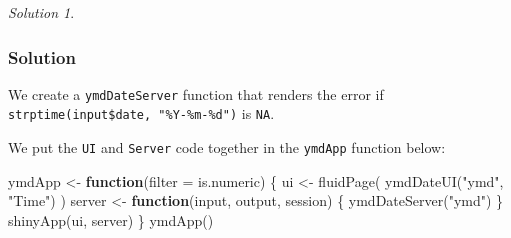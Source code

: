 \documentclass[
]{book}
\newenvironment{Shaded}{\begin{snugshade}}{\end{snugshade}}
\newcommand{\AttributeTok}[1]{\textcolor[rgb]{0.77,0.63,0.00}{#1}}
\newcommand{\ConstantTok}[1]{\textcolor[rgb]{0.00,0.00,0.00}{#1}}
\newcommand{\ControlFlowTok}[1]{\textcolor[rgb]{0.13,0.29,0.53}{\textbf{#1}}}
\newcommand{\FunctionTok}[1]{\textcolor[rgb]{0.00,0.00,0.00}{#1}}
\newcommand{\NormalTok}[1]{#1}
\newcommand{\OtherTok}[1]{\textcolor[rgb]{0.56,0.35,0.01}{#1}}
\newcommand{\SpecialCharTok}[1]{\textcolor[rgb]{0.00,0.00,0.00}{#1}}
\newcommand{\StringTok}[1]{\textcolor[rgb]{0.31,0.60,0.02}{#1}}
\theoremstyle{definition}
\theoremstyle{definition}
\theoremstyle{definition}
\theoremstyle{definition}
\theoremstyle{remark}
\newtheorem*{solution}{Solution}
\begin{document}
\begin{solution}
\leavevmode

\hypertarget{solution-49}{%
\subsubsection*{Solution}\label{solution-49}}

We create a \texttt{ymdDateServer} function that renders the error if \texttt{strptime(input\$date,\ "\%Y-\%m-\%d")} is \texttt{NA}.

\begin{Shaded}
\end{Shaded}

We put the \texttt{UI} and \texttt{Server} code together in the \texttt{ymdApp} function below:

\begin{Shaded}
\begin{Highlighting}[]
\NormalTok{ymdApp }\OtherTok{\textless{}{-}} \ControlFlowTok{function}\NormalTok{(}\AttributeTok{filter =}\NormalTok{ is.numeric) \{}
\NormalTok{    ui }\OtherTok{\textless{}{-}} \FunctionTok{fluidPage}\NormalTok{(}
        \FunctionTok{ymdDateUI}\NormalTok{(}\StringTok{"ymd"}\NormalTok{, }\StringTok{"Time"}\NormalTok{)}
\NormalTok{    )}
\NormalTok{    server }\OtherTok{\textless{}{-}} \ControlFlowTok{function}\NormalTok{(input, output, session) \{}
        \FunctionTok{ymdDateServer}\NormalTok{(}\StringTok{"ymd"}\NormalTok{)}
\NormalTok{    \}}
    \FunctionTok{shinyApp}\NormalTok{(ui, server)}
\NormalTok{\}}
\FunctionTok{ymdApp}\NormalTok{()}
\end{Highlighting}
\end{Shaded}

\end{solution}
\end{document}
